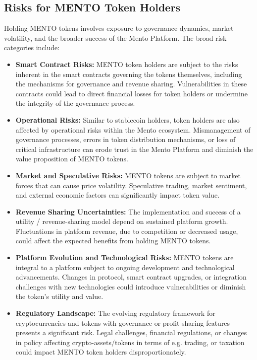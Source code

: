 \documentclass[a4paper]{article}
\theoremstyle{definition}
\begin{document}
\subsection{Risks for MENTO Token Holders}

Holding MENTO tokens involves exposure to governance dynamics, market volatility, and the broader success of the Mento Platform. The broad risk categories include:

\begin{itemize}
    \item \textbf{Smart Contract Risks:} MENTO token holders are subject to the risks inherent in the smart contracts governing the tokens themselves, including the mechanisms for governance and revenue sharing. Vulnerabilities in these contracts could lead to direct financial losses for token holders or undermine the integrity of the governance process.
    
    \item \textbf{Operational Risks:} Similar to stablecoin holders, token holders are also affected by operational risks within the Mento ecosystem. Mismanagement of governance processes, errors in token distribution mechanisms, or loss of critical infrastructure can erode trust in the Mento Platform and diminish the value proposition of MENTO tokens.
    
    \item \textbf{Market and Speculative Risks:} MENTO tokens are subject to market forces that can cause price volatility. Speculative trading, market sentiment, and external economic factors can significantly impact token value.
    
    \item \textbf{Revenue Sharing Uncertainties:} The implementation and success of a utility / revenue-sharing model depend on sustained platform growth. Fluctuations in platform revenue, due to competition or decreased usage, could affect the expected benefits from holding MENTO tokens.
    
    \item \textbf{Platform Evolution and Technological Risks:} MENTO tokens are integral to a platform subject to ongoing development and technological advancements. Changes in protocol, smart contract upgrades, or integration challenges with new technologies could introduce vulnerabilities or diminish the token's utility and value.
    
    \item \textbf{Regulatory Landscape:} The evolving regulatory framework for cryptocurrencies and tokens with governance or profit-sharing features presents a significant risk. Legal challenges, financial regulations, or changes in policy affecting crypto-assets/tokens in terms of e.g. trading, or taxation could impact MENTO token holders disproportionately.


\end{itemize}
\end{document}
